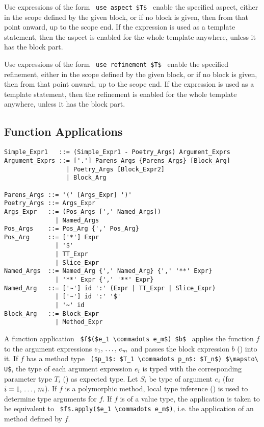 Use expressions of the form ~\lstinline!use aspect $T$!~ enable the specified aspect, either in the scope defined by the given block, or if no block is given, then from that point onward, up to the scope end. If the expression is used as a template statement, then the aspect is enabled for the whole template anywhere, unless it has the block part. 

Use expressions of the form ~\lstinline!use refinement $T$!~ enable the specified refinement, either in the scope defined by the given block, or if no block is given, then from that point onward, up to the scope end. If the expression is used as a template statement, then the refinement is enabled for the whole template anywhere, unless it has the block part. 








\subsection{Function Applications}
\label{sec:function-applications}

\syntax\begin{lstlisting}[mathescape=false]
Simple_Expr1   ::= (Simple_Expr1 - Poetry_Args) Argument_Exprs 
Argument_Exprs ::= ['.'] Parens_Args {Parens_Args} [Block_Arg] 
                 | Poetry_Args [Block_Expr2]
                 | Block_Arg

Parens_Args ::= '(' [Args_Expr] ')'
Poetry_Args ::= Args_Expr
Args_Expr   ::= (Pos_Args [',' Named_Args])
              | Named_Args
Pos_Args    ::= Pos_Arg {',' Pos_Arg}
Pos_Arg     ::= ['*'] Expr 
              | '$' 
              | TT_Expr
              | Slice_Expr
Named_Args  ::= Named_Arg {',' Named_Arg} {',' '**' Expr}
              | '**' Expr {',' '**' Expr}
Named_Arg   ::= ['~'] id ':' (Expr | TT_Expr | Slice_Expr)
              | ['~'] id ':' '$'
              | '~' id
Block_Arg   ::= Block_Expr 
              | Method_Expr
\end{lstlisting}


A function application ~\lstinline!$f$($e_1 \commadots e_m$) $b$!~ applies the function $f$ to the argument expressions $e_1 ,\, \ldots ,\, e_m$ and passes the block expression $b$ () into it. If $f$ has a method type ~\lstinline!($p_1$: $T_1 \commadots p_n$: $T_n$) $\mapsto\ U$!, the type of each argument expression $e_i$ is typed with the corresponding parameter type $T_i$ () as expected type. Let $S_i$ be type of argument $e_i$ (for $i = 1 ,\, \ldots ,\, m$). If $f$ is a polymorphic method, local type inference () is used to determine type arguments for $f$. If $f$ is of a value type, the application is taken to be equivalent to ~\lstinline!$f$.apply($e_1 \commadots e_m$)!, i.e. the application of an  method defined by $f$. 

